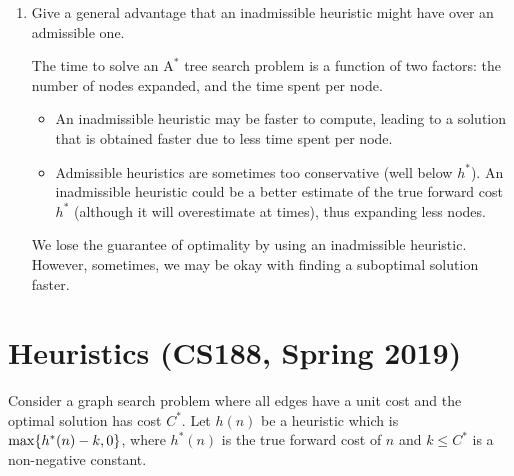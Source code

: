 \documentclass[11pt, a4paper]{article}
\def\Astar{$\text{A}^*$}
\begin{document}
\begin{enumerate}
    \item Give a general advantage that an inadmissible heuristic might have over an admissible one.

    \begin{solution}
        The time to solve an \Astar{} tree search problem is a function of two factors: the number of nodes expanded, and the time spent per node.
        \begin{itemize}
            \item An inadmissible heuristic may be faster to compute, leading to a solution that is obtained faster due to less time spent per node.
            \item Admissible heuristics are sometimes too conservative (well below $h^*$). An inadmissible heuristic could be a better estimate of the true forward cost $h^*$ (although it will overestimate at times), thus expanding less nodes.
        \end{itemize}
        We lose the guarantee of optimality by using an inadmissible heuristic. However, sometimes, we may be okay with finding a suboptimal solution faster.
    \end{solution}
\end{enumerate}

\newpage

\section{Heuristics (CS188, Spring 2019)}

Consider a graph search problem where all edges have a unit cost and the optimal solution has cost $C^*$. Let $h(n)$ be a heuristic which is $\max \{h^*(n) - k, 0\}$, where $h^*(n)$ is the true forward cost of $n$ and $k \leq C^*$ is a non-negative constant.
\end{document}
